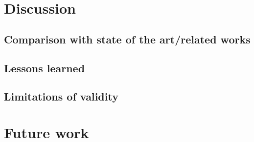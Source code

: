 \chapter{Discussion}%
\section{Comparison with state of the art/related works}%
\section{Lessons learned}%
\section{Limitations of validity}%

\chapter{Future work}
\pagestyle{fancy}
\lipsum[1-5] 